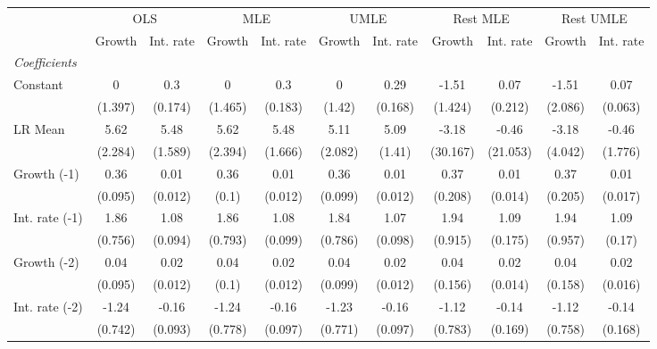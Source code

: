 \begin{table}[htbp] 
	\centering
	\begin{tabular}{@{\extracolsep{4pt}}lcccccccccc@{}}		\hline\hline
		 		 & \multicolumn{2}{c}{OLS} &\multicolumn{2}{c}{MLE} &\multicolumn{2}{c}{UMLE} &\multicolumn{2}{c}{Rest MLE} &\multicolumn{2}{c}{Rest UMLE} \\ 
 		 & Growth 	 & Int. rate 	 & Growth 	 & Int. rate 	 & Growth 	 & Int. rate 	 & Growth 	 & Int. rate 	 & Growth 	 & Int. rate\\\cline{2-3}\cline{4-5}\cline{6-7}\cline{8-9}\cline{10-11}
\rule{0pt}{4ex} 
 \emph{Coefficients} 	  		 & 		 & 		 & 		 & 		 & 		 & 		 & 		 & 		 & 		 &\\ 
\quad Constant 	 & 0 	 & 0.3 	 & 0 	 & 0.3 	 & 0 	 & 0.29 	 & -1.51 	 & 0.07 	 & -1.51 	 & 0.07	 \\ 
 		 & (1.397) 	 & (0.174) 	 & (1.465) 	 & (0.183) 	 & (1.42) 	 & (0.168) 	 & (1.424) 	 & (0.212) 	 & (2.086) 	 & (0.063) 	 \\ 
\quad LR Mean 	 & 5.62 	 & 5.48 	 & 5.62 	 & 5.48 	 & 5.11 	 & 5.09 	 & -3.18 	 & -0.46 	 & -3.18 	 & -0.46	 \\ 
 		 & (2.284) 	 & (1.589) 	 & (2.394) 	 & (1.666) 	 & (2.082) 	 & (1.41) 	 & (30.167) 	 & (21.053) 	 & (4.042) 	 & (1.776) 	 \\ 
\quad Growth (-1) 	 &0.36 	 & 0.01 	 & 0.36 	 & 0.01 	 & 0.36 	 & 0.01 	 & 0.37 	 & 0.01 	 & 0.37 	 & 0.01	 \\ 
 		 & (0.095) 	 & (0.012) 	 & (0.1) 	 & (0.012) 	 & (0.099) 	 & (0.012) 	 & (0.208) 	 & (0.014) 	 & (0.205) 	 & (0.017) 	 \\ 
\quad Int. rate (-1) 	 &1.86 	 & 1.08 	 & 1.86 	 & 1.08 	 & 1.84 	 & 1.07 	 & 1.94 	 & 1.09 	 & 1.94 	 & 1.09	 \\ 
 		 & (0.756) 	 & (0.094) 	 & (0.793) 	 & (0.099) 	 & (0.786) 	 & (0.098) 	 & (0.915) 	 & (0.175) 	 & (0.957) 	 & (0.17) 	 \\ 
\quad Growth (-2) 	 &0.04 	 & 0.02 	 & 0.04 	 & 0.02 	 & 0.04 	 & 0.02 	 & 0.04 	 & 0.02 	 & 0.04 	 & 0.02	 \\ 
 		 & (0.095) 	 & (0.012) 	 & (0.1) 	 & (0.012) 	 & (0.099) 	 & (0.012) 	 & (0.156) 	 & (0.014) 	 & (0.158) 	 & (0.016) 	 \\ 
\quad Int. rate (-2) 	 &-1.24 	 & -0.16 	 & -1.24 	 & -0.16 	 & -1.23 	 & -0.16 	 & -1.12 	 & -0.14 	 & -1.12 	 & -0.14	 \\ 
 		 & (0.742) 	 & (0.093) 	 & (0.778) 	 & (0.097) 	 & (0.771) 	 & (0.097) 	 & (0.783) 	 & (0.169) 	 & (0.758) 	 & (0.168) 	 \\ 

\end{tabular}
\end{table}
